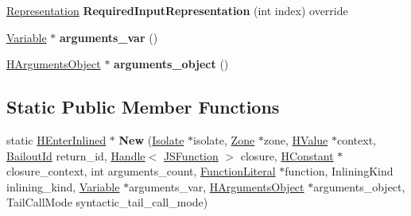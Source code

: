 \begin{DoxyCompactItemize}
\item 
\hyperlink{classv8_1_1internal_1_1_representation}{Representation} {\bfseries Required\+Input\+Representation} (int index) override\hypertarget{classv8_1_1internal_1_1_h_enter_inlined_ae8e7afb1eae6ede0ea52b6e2ba369415}{}\label{classv8_1_1internal_1_1_h_enter_inlined_ae8e7afb1eae6ede0ea52b6e2ba369415}

\item 
\hyperlink{classv8_1_1internal_1_1_variable}{Variable} $\ast$ {\bfseries arguments\+\_\+var} ()\hypertarget{classv8_1_1internal_1_1_h_enter_inlined_ada8873f399d9c8c5f49572c3137a24eb}{}\label{classv8_1_1internal_1_1_h_enter_inlined_ada8873f399d9c8c5f49572c3137a24eb}

\item 
\hyperlink{classv8_1_1internal_1_1_h_arguments_object}{H\+Arguments\+Object} $\ast$ {\bfseries arguments\+\_\+object} ()\hypertarget{classv8_1_1internal_1_1_h_enter_inlined_a0e26f9c5c6f9e8fb95be484ce33a1776}{}\label{classv8_1_1internal_1_1_h_enter_inlined_a0e26f9c5c6f9e8fb95be484ce33a1776}

\end{DoxyCompactItemize}
\subsection*{Static Public Member Functions}
\begin{DoxyCompactItemize}
\item 
static \hyperlink{classv8_1_1internal_1_1_h_enter_inlined}{H\+Enter\+Inlined} $\ast$ {\bfseries New} (\hyperlink{classv8_1_1internal_1_1_isolate}{Isolate} $\ast$isolate, \hyperlink{classv8_1_1internal_1_1_zone}{Zone} $\ast$zone, \hyperlink{classv8_1_1internal_1_1_h_value}{H\+Value} $\ast$context, \hyperlink{classv8_1_1internal_1_1_bailout_id}{Bailout\+Id} return\+\_\+id, \hyperlink{classv8_1_1internal_1_1_handle}{Handle}$<$ \hyperlink{classv8_1_1internal_1_1_j_s_function}{J\+S\+Function} $>$ closure, \hyperlink{classv8_1_1internal_1_1_h_constant}{H\+Constant} $\ast$closure\+\_\+context, int arguments\+\_\+count, \hyperlink{classv8_1_1internal_1_1_function_literal}{Function\+Literal} $\ast$function, Inlining\+Kind inlining\+\_\+kind, \hyperlink{classv8_1_1internal_1_1_variable}{Variable} $\ast$arguments\+\_\+var, \hyperlink{classv8_1_1internal_1_1_h_arguments_object}{H\+Arguments\+Object} $\ast$arguments\+\_\+object, Tail\+Call\+Mode syntactic\+\_\+tail\+\_\+call\+\_\+mode)\hypertarget{classv8_1_1internal_1_1_h_enter_inlined_a64555c9adcd2e62fcc999842d6560620}{}\label{classv8_1_1internal_1_1_h_enter_inlined_a64555c9adcd2e62fcc999842d6560620}

\end{DoxyCompactItemize}
